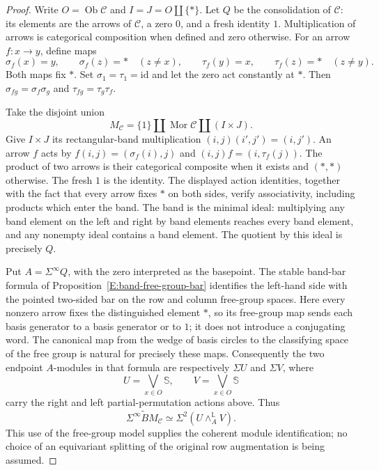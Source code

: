 \begin{proof}
Write $O=\operatorname{Ob}\mathcal C$ and $I=J=O\amalg\{*\}$.
Let $Q$ be the consolidation of $\mathcal C$: its elements are the
arrows of $\mathcal C$, a zero $0$, and a fresh identity $1$.
Multiplication of arrows is categorical composition when defined and
zero otherwise.  For an arrow $f:x\to y$, define maps
\[
 \sigma_f(x)=y,\qquad \sigma_f(z)=*\quad(z\ne x),
 \qquad
 \tau_f(y)=x,\qquad \tau_f(z)=*\quad(z\ne y).
\]
Both maps fix $*$.  Set $\sigma_1=\tau_1=\mathrm{id}$ and let the
zero act constantly at $*$.  Then
$\sigma_{fg}=\sigma_f\sigma_g$ and
$\tau_{fg}=\tau_g\tau_f$.

Take the disjoint union
\[
 M_{\mathcal C}=\{1\}\amalg\operatorname{Mor}\mathcal C
                       \amalg(I\times J).
\]
Give $I\times J$ its rectangular-band multiplication
$(i,j)(i',j')=(i,j')$.  An arrow $f$ acts by
$f(i,j)=(\sigma_f(i),j)$ and
$(i,j)f=(i,\tau_f(j))$.  The product of two arrows is their
categorical composite when it exists and $(*,*)$ otherwise.
The fresh $1$ is the identity.  The displayed action identities,
together with the fact that every arrow fixes $*$ on both sides,
verify associativity, including products which enter the band.
The band is the minimal ideal: multiplying any band element on the
left and right by band elements reaches every band element, and any
nonempty ideal contains a band element.  The quotient by this ideal
is precisely $Q$.

Put $A=\Sigma^\infty Q$, with the zero interpreted as the basepoint.
The stable band-bar formula of
Proposition~\ref{E:band-free-group-bar} identifies the left-hand side
with the pointed two-sided bar on the row and column free-group
spaces.  Here every nonzero arrow fixes the distinguished element
$*$, so its free-group map sends each basis generator to a basis
generator or to $1$; it does not introduce a conjugating word.
The canonical map from the wedge of basis circles to the classifying
space of the free group is natural for precisely these maps.
Consequently the two endpoint $A$-modules in that formula are
respectively $\Sigma U$ and $\Sigma V$, where
\[
 U=\bigvee_{x\in O}\mathbb S,
 \qquad V=\bigvee_{x\in O}\mathbb S
\]
carry the right and left partial-permutation actions above.  Thus
\[
 \widetilde{\Sigma^\infty BM_{\mathcal C}}
       \simeq \Sigma^2(U\mathbin{\wedge_A^{\mathbb L}}V).
\]
This use of the free-group model supplies the coherent module
identification; no choice of an equivariant splitting of the original
row augmentation is being assumed.


\end{proof}
